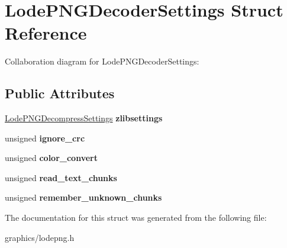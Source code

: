 \hypertarget{struct_lode_p_n_g_decoder_settings}{\section{Lode\+P\+N\+G\+Decoder\+Settings Struct Reference}
\label{struct_lode_p_n_g_decoder_settings}
}


Collaboration diagram for Lode\+P\+N\+G\+Decoder\+Settings\+:
\subsection*{Public Attributes}
\begin{DoxyCompactItemize}
\item 
\hypertarget{struct_lode_p_n_g_decoder_settings_a9ae8fef9880bef97a3e932f8ea942ed8}{\hyperlink{struct_lode_p_n_g_decompress_settings}{Lode\+P\+N\+G\+Decompress\+Settings} {\bfseries zlibsettings}}\label{struct_lode_p_n_g_decoder_settings_a9ae8fef9880bef97a3e932f8ea942ed8}

\item 
\hypertarget{struct_lode_p_n_g_decoder_settings_a6390c403d2a5718242337bbbaf15131d}{unsigned {\bfseries ignore\+\_\+crc}}\label{struct_lode_p_n_g_decoder_settings_a6390c403d2a5718242337bbbaf15131d}

\item 
\hypertarget{struct_lode_p_n_g_decoder_settings_af26f2b29cd338ce4476bee9571a0818a}{unsigned {\bfseries color\+\_\+convert}}\label{struct_lode_p_n_g_decoder_settings_af26f2b29cd338ce4476bee9571a0818a}

\item 
\hypertarget{struct_lode_p_n_g_decoder_settings_aa1212905c3f73d9fffef2c04a220d951}{unsigned {\bfseries read\+\_\+text\+\_\+chunks}}\label{struct_lode_p_n_g_decoder_settings_aa1212905c3f73d9fffef2c04a220d951}

\item 
\hypertarget{struct_lode_p_n_g_decoder_settings_a8775e4fc539dc457916720f52b442f27}{unsigned {\bfseries remember\+\_\+unknown\+\_\+chunks}}\label{struct_lode_p_n_g_decoder_settings_a8775e4fc539dc457916720f52b442f27}

\end{DoxyCompactItemize}


The documentation for this struct was generated from the following file\+:\begin{DoxyCompactItemize}
\item 
graphics/lodepng.\+h\end{DoxyCompactItemize}
